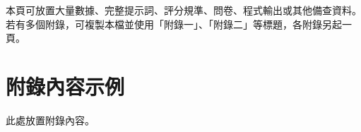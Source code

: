 
本頁可放置大量數據、完整提示詞、評分規準、問卷、程式輸出或其他備查資料。若有多個附錄，可複製本檔並使用「附錄一」、「附錄二」等標題，各附錄另起一頁。

\section*{附錄內容示例}
此處放置附錄內容。
